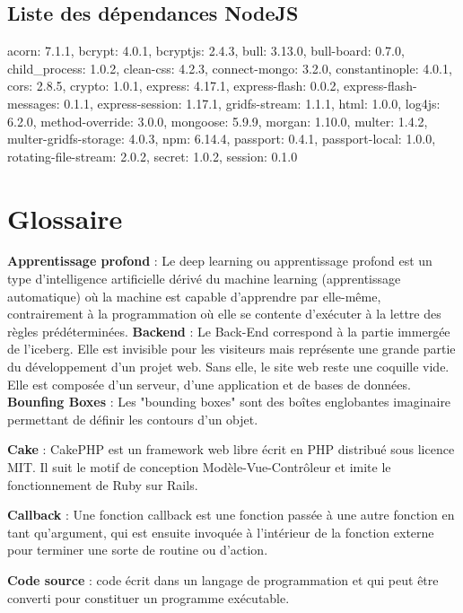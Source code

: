 \documentclass[oneside,a4paper,13pt]{article}
\begin{document}
\subsection*{Liste des dépendances NodeJS}

acorn: 7.1.1, 
    bcrypt: 4.0.1, 
    bcryptjs: 2.4.3, 
    bull: 3.13.0, 
    bull-board: 0.7.0, 
    child_process: 1.0.2, 
    clean-css: 4.2.3, 
    connect-mongo: 3.2.0, 
    constantinople: 4.0.1, 
    cors: 2.8.5, 
    crypto: 1.0.1, 
    express: 4.17.1, 
    express-flash: 0.0.2, 
    express-flash-messages: 0.1.1, 
    express-session: 1.17.1, 
    gridfs-stream: 1.1.1, 
    html: 1.0.0, 
    log4js: 6.2.0, 
    method-override: 3.0.0, 
    mongoose: 5.9.9, 
    morgan: 1.10.0, 
    multer: 1.4.2, 
    multer-gridfs-storage: 4.0.3, 
    npm: 6.14.4, 
    passport: 0.4.1, 
    passport-local: 1.0.0, 
    rotating-file-stream: 2.0.2, 
    secret: 1.0.2, 
    session: 0.1.0

\section{Glossaire}
\textbf{Apprentissage profond} : Le deep learning ou apprentissage profond est un type d'intelligence artificielle dérivé du machine learning (apprentissage automatique) où la machine est capable d'apprendre par elle-même, contrairement à la programmation où elle se contente d'exécuter à la lettre des règles prédéterminées.
\medbreak
\textbf{Backend} : Le Back-End correspond à la partie immergée de l'iceberg. Elle est invisible pour les visiteurs mais représente une grande partie du développement d'un projet web. Sans elle, le site web reste une coquille vide. Elle est composée d'un serveur, d'une application et de bases de données. 
\medbreak
\textbf{Bounfing Boxes} : Les "bounding boxes" sont des boîtes englobantes imaginaire permettant de définir les contours d'un objet.
\medbreak

\medbreak
\textbf{Cake} : CakePHP est un framework web libre écrit en PHP distribué sous licence MIT. Il suit le motif de conception Modèle-Vue-Contrôleur et imite le fonctionnement de Ruby sur Rails.

\medbreak
\textbf{Callback} : Une fonction callback est une fonction passée à une autre fonction en tant qu'argument, qui est ensuite invoquée à l'intérieur de la fonction externe pour terminer une sorte de routine ou d'action.

\textbf{Code source} : code écrit dans un langage de programmation et qui peut être converti pour constituer un programme exécutable.
\end{document}
